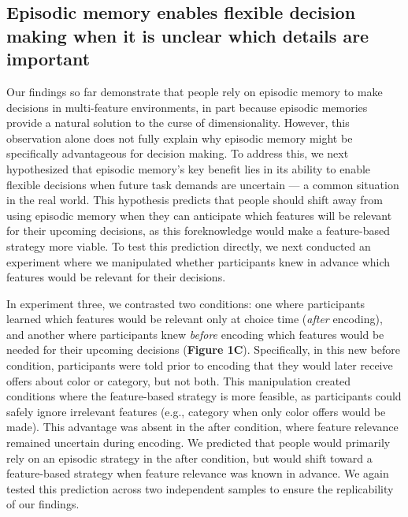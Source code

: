 \documentclass[10pt,letterpaper]{article}
\begin{document}
\subsection{Episodic memory enables flexible decision making when it is unclear which details are important}

Our findings so far demonstrate that people rely on episodic memory to make decisions in multi-feature environments, in part because episodic memories provide a natural solution to the curse of dimensionality. However, this observation alone does not fully explain why episodic memory might be specifically advantageous for decision making. To address this, we next hypothesized that episodic memory's key benefit lies in its ability to enable flexible decisions when future task demands are uncertain --- a common situation in the real world. This hypothesis predicts that people should shift away from using episodic memory when they can anticipate which features will be relevant for their upcoming decisions, as this foreknowledge would make a feature-based strategy more viable. To test this prediction directly, we next conducted an experiment where we manipulated whether participants knew in advance which features would be relevant for their decisions.

In experiment three, we contrasted two conditions: one where participants learned which features would be relevant only at choice time (\textit{after} encoding), and another where participants knew \textit{before} encoding which features would be needed for their upcoming decisions (\textbf{Figure 1C}). Specifically, in this new before condition, participants were told prior to encoding that they would later receive offers about color or category, but not both. This manipulation created conditions where the feature-based strategy is more feasible, as participants could safely ignore irrelevant features (e.g., category when only color offers would be made). This advantage was absent in the after condition, where feature relevance remained uncertain during encoding. We predicted that people would primarily rely on an episodic strategy in the after condition, but would shift toward a feature-based strategy when feature relevance was known in advance. We again tested this prediction across two independent samples to ensure the replicability of our findings.
\end{document}
